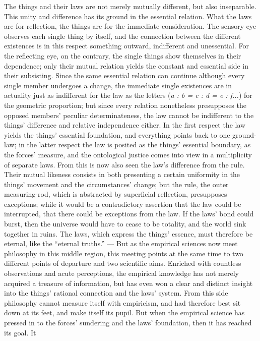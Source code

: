 \documentclass[12pt]{book}
\begin{document}
The things and their laws are not merely mutually different, but also
inseparable. This unity and difference has its ground in the essential
relation. What the laws are for reflection, the things are for the immediate
consideration. The sensory eye observes each single thing by itself, and the
connection between the different existences is in this respect something
outward, indifferent and unessential. For the reflecting eye, on the
contrary, the single things show themselves in their dependence; only their
mutual relation yields the constant and essential side in their subsisting.
Since the same essential relation can continue although every single member
undergoes a change, the immediate single existences are in actuality just as
indifferent for the law as the letters (\textit{a : b = c : d = e : f...})
for the geometric proportion; but since every relation nonetheless
presupposes the opposed members' peculiar determinateness, the law cannot be
indifferent to the things' difference and relative independence either. In
the first respect the law yields the things' essential foundation, and
everything points back to one ground-law; in the latter respect the law is
posited as the things' essential boundary, as the forces' measure, and the
ontological justice comes into view in a multiplicity of separate laws. From
this is now also seen the law's difference from the rule. Their mutual
likeness consists in both presenting a certain uniformity in the things'
movement and the circumstances' change; but the rule, the outer
measuring-rod, which is abstracted by superficial reflection, presupposes
exceptions; while it would be a contradictory assertion that the law could
be interrupted, that there could be exceptions from the law. If the laws'
bond could burst, then the universe would have to cease to be totality, and
the world sink together in ruins. The laws, which express the things'
essence, must therefore be eternal, like the ``eternal truths.'' --- But as
the empirical sciences now meet philosophy in this middle region, this
meeting points at the same time to two different points of departure and two
scientific aims. Enriched with countless observations and acute perceptions,
the empirical knowledge has not merely acquired a treasure of information,
but has even won a clear and distinct insight into the things' rational
connection and the laws' system. From this side philosophy cannot measure
itself with empiricism, and had therefore best sit down at its feet, and
make itself its pupil. But when the empirical science has pressed in to the
forces' sundering and the laws' foundation, then it has reached its goal. It
\end{document}
